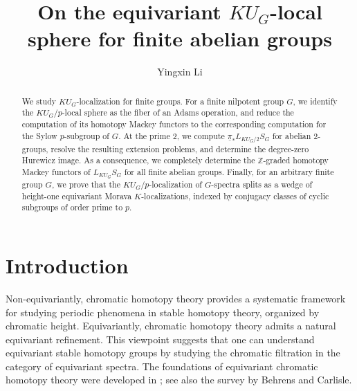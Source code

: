\documentclass{amsart}
\title{On the equivariant $KU_G$-local sphere for finite abelian groups}
\author{Yingxin Li}
\theoremstyle{plain}
\theoremstyle{definition}
\theoremstyle{remark}
\begin{document}
\begin{abstract}
We study $KU_G$-localization for finite groups. For a finite nilpotent group $G$, we identify the $KU_G/p$-local sphere as the fiber of an Adams operation, and reduce the computation of its homotopy Mackey functors to the corresponding computation for the Sylow $p$-subgroup of $G$. At the prime $2$, we compute $\underline{\pi}_* L_{KU_G/2}S_G$ for abelian $2$-groups, resolve the resulting extension problems, and determine the degree-zero Hurewicz image. As a consequence, we completely determine the $\mathbb Z$-graded homotopy Mackey functors of $L_{KU_G}S_G$ for all finite abelian groups. Finally, for an arbitrary finite group $G$, we prove that the $KU_G/p$-localization of $G$-spectra splits as a wedge of height-one equivariant Morava $K$-localizations, indexed by conjugacy classes of cyclic subgroups of order prime to $p$.
\end{abstract}

\maketitle
\tableofcontents




\section{Introduction}
Non-equivariantly, chromatic homotopy theory provides a systematic framework for studying periodic phenomena in stable homotopy theory, organized by chromatic height. Equivariantly, chromatic homotopy theory admits a natural equivariant refinement. This viewpoint suggests that one can understand equivariant stable homotopy groups by studying the chromatic filtration in the category of equivariant spectra. The foundations of equivariant chromatic homotopy theory were developed in \cite{cole2000equivariant,strickland2011multicurves,hanke2018equivariant,barthel2020balmer,hu2021equivariant,hausmann2022global,hausmann2023invariant,wisdom2024properties}; see also the survey by Behrens and Carlisle\cite{behrens2024periodic}.
\end{document}
